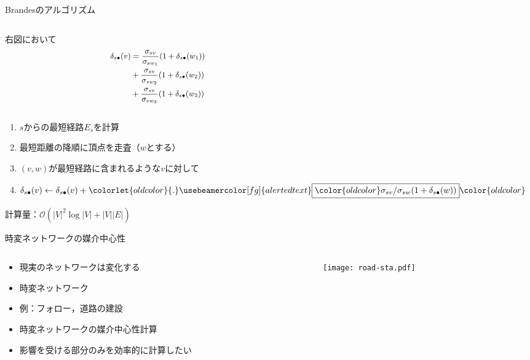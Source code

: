 \documentclass[dvipdfmx,fleqn]{beamer}
\begin{document}
\begin{frame}{Brandesのアルゴリズム}
  \begin{columns}
    \begin{column}{.49\textwidth}
      右図において
      \begin{equation*}\small
        \begin{aligned}
          \delta_{s\bullet}(v)&=\frac{\sigma_{sv}}{\sigma_{sw_1}}(1+\delta_{s\bullet}(w_1)) \\
          &+\frac{\sigma_{sv}}{\sigma_{sw_2}}(1+\delta_{s\bullet}(w_2)) \\
          &+\frac{\sigma_{sv}}{\sigma_{sw_3}}(1+\delta_{s\bullet}(w_3))
        \end{aligned}
      \end{equation*}
    \end{column}
    \begin{column}{.49\textwidth}
      \centering
      \def\svgwidth{.9\columnwidth}
      
    \end{column}
  \end{columns}
  \medskip
  \begin{enumerate}
  \item $s$からの最短経路$E_s$を計算
  \item 最短距離の降順に頂点を走査（$w$とする）
  \item $(v,w)$が最短経路に含まれるような$v$に対して
  \item[] $\delta_{s\bullet}(v)\gets\delta_{s\bullet}(v)+\colorlet{oldcolor}{.}\usebeamercolor[fg]{alerted text}\fbox{$\color{oldcolor}\sigma_{sv}/\sigma_{sw}(1+\delta_{s\bullet}(w))$}\color{oldcolor}$
  \end{enumerate}
  計算量：\alert{$\mathcal{O}(|V|^2\log |V|+|V||E|)$}
\end{frame}

\begin{frame}{時変ネットワークの媒介中心性}
  \begin{columns}
    \begin{column}{.5\textwidth}
      \begin{itemize}
      \item 現実のネットワークは変化する
      \item[] \alert{時変ネットワーク}
      \item[] 例：フォロー，道路の建設
      \item 時変ネットワークの媒介中心性計算
      \item 影響を受ける部分のみを効率的に計算したい
      \end{itemize}
    \end{column}
    \begin{column}{.5\textwidth}
      \texttt{[image: road-sta.pdf]}
    \end{column}
  \end{columns}
\end{frame}
\end{document}

